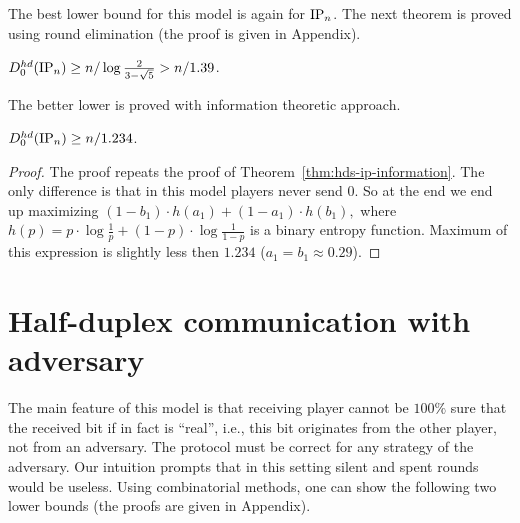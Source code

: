 The best lower bound for this model is again for $\mathrm{IP}_n$. The next theorem is proved using round elimination (the proof is given in Appendix).
\begin{theorem}\label{thm:hdz-ip}
$D^{hd}_0(\mathrm{IP}_n)\ge n / \log \frac{2}{3 - \sqrt{5}} > n/1.39$.
\end{theorem}
The better lower is proved with information theoretic approach.
\begin{theorem}\label{thm:hdz-ip-information}
$D^{hd}_0(\mathrm{IP}_n)\ge n/1.234$.
\end{theorem}
\begin{proof}
The proof repeats the proof of Theorem~\ref{thm:hds-ip-information}.
The only difference is that in this model players never send 0. So at the end
we end up maximizing 
$
(1 - b_1) \cdot h(a_1) + (1 - a_1) \cdot h(b_1),
$
where $h(p) = p\cdot\log\frac{1}{p} + (1 - p)\cdot\log\frac{1}{1 - p}$ is a binary entropy function. Maximum of this expression is slightly less then $1.234$ ($a_1 = b_1 \approx 0.29$).
\end{proof}

\section{Half-duplex communication with adversary}\label{sec:hda}
The main feature of this model is that receiving player cannot be $100\%$ sure that
the received bit if in fact is ``real'', i.e., this bit originates from the other player,
not from an adversary. The protocol must be correct for any strategy of the adversary.
Our intuition prompts that in this setting silent and spent rounds would be useless.
Using combinatorial methods, one can show the following two lower bounds (the proofs are given in Appendix).


